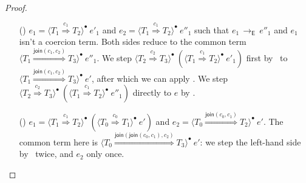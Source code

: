 \documentclass[9pt]{extarticle}
\newcommand{\ottnt}[1]{\mathit{#1}}
\newcommand{\ottsym}[1]{#1}
\begin{document}
\begin{lemma}
\begin{proof}
{\begin{itemize}
    \item[(\E{CoerceInner})] $\ottnt{e_{{\mathrm{1}}}}  \ottsym{=}   \langle  \ottnt{T_{{\mathrm{1}}}}  \mathord{ \overset{ \ottnt{c_{{\mathrm{1}}}} }{\Rightarrow} }  \ottnt{T_{{\mathrm{2}}}}  \rangle^{\bullet} ~  \ottnt{e'_{{\mathrm{1}}}} $ and $\ottnt{e_{{\mathrm{2}}}}  \ottsym{=}   \langle  \ottnt{T_{{\mathrm{1}}}}  \mathord{ \overset{ \ottnt{c_{{\mathrm{1}}}} }{\Rightarrow} }  \ottnt{T_{{\mathrm{2}}}}  \rangle^{\bullet} ~  \ottnt{e''_{{\mathrm{1}}}} $ such that $\ottnt{e_{{\mathrm{1}}}} \,  \longrightarrow _{  \mathsf{E}  }  \, \ottnt{e''_{{\mathrm{1}}}}$ and $\ottnt{e_{{\mathrm{1}}}}$ isn't a
      coercion term.
Both sides reduce to the common term $ \langle  \ottnt{T_{{\mathrm{1}}}}  \mathord{ \overset{  \mathsf{join} ( \ottnt{c_{{\mathrm{1}}}} , \ottnt{c_{{\mathrm{2}}}} )  }{\Rightarrow} }  \ottnt{T_{{\mathrm{3}}}}  \rangle^{\bullet} ~  \ottnt{e''_{{\mathrm{1}}}} $.
We step $ \langle  \ottnt{T_{{\mathrm{2}}}}  \mathord{ \overset{ \ottnt{c_{{\mathrm{2}}}} }{\Rightarrow} }  \ottnt{T_{{\mathrm{3}}}}  \rangle^{\bullet} ~   (  \langle  \ottnt{T_{{\mathrm{1}}}}  \mathord{ \overset{ \ottnt{c_{{\mathrm{1}}}} }{\Rightarrow} }  \ottnt{T_{{\mathrm{2}}}}  \rangle^{\bullet} ~  \ottnt{e'_{{\mathrm{1}}}}  )  $ first by
      \ECastMerge\ to $ \langle  \ottnt{T_{{\mathrm{1}}}}  \mathord{ \overset{  \mathsf{join} ( \ottnt{c_{{\mathrm{1}}}} , \ottnt{c_{{\mathrm{2}}}} )  }{\Rightarrow} }  \ottnt{T_{{\mathrm{3}}}}  \rangle^{\bullet} ~  \ottnt{e'} $, after which we can
      apply . We step $ \langle  \ottnt{T_{{\mathrm{2}}}}  \mathord{ \overset{ \ottnt{c_{{\mathrm{2}}}} }{\Rightarrow} }  \ottnt{T_{{\mathrm{3}}}}  \rangle^{\bullet} ~   (  \langle  \ottnt{T_{{\mathrm{1}}}}  \mathord{ \overset{ \ottnt{c_{{\mathrm{1}}}} }{\Rightarrow} }  \ottnt{T_{{\mathrm{2}}}}  \rangle^{\bullet} ~  \ottnt{e''_{{\mathrm{1}}}}  )  $ directly to $\ottnt{e}$ by \ECastMerge.

    \item[(\ECastMerge)] $\ottnt{e_{{\mathrm{1}}}}  \ottsym{=}   \langle  \ottnt{T_{{\mathrm{1}}}}  \mathord{ \overset{ \ottnt{c_{{\mathrm{1}}}} }{\Rightarrow} }  \ottnt{T_{{\mathrm{2}}}}  \rangle^{\bullet} ~   (  \langle  \ottnt{T_{{\mathrm{0}}}}  \mathord{ \overset{ \ottnt{c_{{\mathrm{0}}}} }{\Rightarrow} }  \ottnt{T_{{\mathrm{1}}}}  \rangle^{\bullet} ~  \ottnt{e'}  )  $
      and $\ottnt{e_{{\mathrm{2}}}}  \ottsym{=}   \langle  \ottnt{T_{{\mathrm{0}}}}  \mathord{ \overset{  \mathsf{join} ( \ottnt{c_{{\mathrm{0}}}} , \ottnt{c_{{\mathrm{1}}}} )  }{\Rightarrow} }  \ottnt{T_{{\mathrm{2}}}}  \rangle^{\bullet} ~  \ottnt{e'} $. The common term here is
      $ \langle  \ottnt{T_{{\mathrm{0}}}}  \mathord{ \overset{  \mathsf{join} (  \mathsf{join} ( \ottnt{c_{{\mathrm{0}}}} , \ottnt{c_{{\mathrm{1}}}} )  , \ottnt{c_{{\mathrm{2}}}} )  }{\Rightarrow} }  \ottnt{T_{{\mathrm{3}}}}  \rangle^{\bullet} ~  \ottnt{e'} $: we step the left-hand side
      by \ECastMerge\ twice, and $\ottnt{e_{{\mathrm{2}}}}$ only once.


\end{itemize}}
\end{proof}
\end{lemma}
\end{document}

